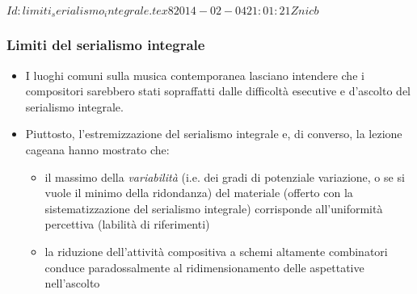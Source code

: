 %
%
\svnInfo $Id: limiti_serialismo_integrale.tex 8 2014-02-04 21:01:21Z nicb $

\setcounter{ms}{0}
\begin{frame}
    \frametitle{Limiti del serialismo integrale}

    \begin{itemize}

        \item I luoghi comuni sulla musica contemporanea
            lasciano intendere che i compositori sarebbero
            stati sopraffatti dalle difficolt\`a
            esecutive e d'ascolto del serialismo integrale.

        \item Piuttosto, l'estremizzazione del serialismo integrale
            e, di converso, la lezione cageana
            hanno mostrato che:

        \begin{itemize}

            \item il massimo della \emph{variabilit\`a}
                (i.e. dei gradi di potenziale variazione,
                o se si vuole il minimo della ridondanza)
                del materiale (offerto con la sistematizzazione
                del serialismo integrale)
                corrisponde all'uniformit\`a percettiva
                (labilit\`a di riferimenti)

            \item la riduzione dell'attivit\`a compositiva
                a schemi altamente combinatori
                conduce paradossalmente al ridimensionamento
                delle aspettative nell'ascolto

        \end{itemize}

    \end{itemize}

\end{frame}
